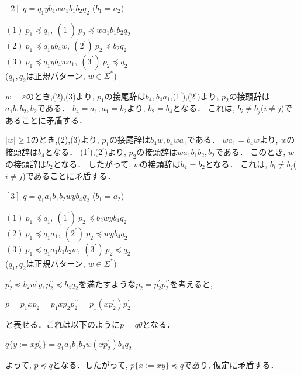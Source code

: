 \noindent $[2]$ $q=q_{1}yb_{4}wa_{1}b_{1}b_{2}q_{2}$ ($b_{1}=a_{2}$)
\medskip

\indent$(1) \ p_{1} \preceq q_{1}, \ (1^{\prime}) \ p_{2} \preceq wa_{1}b_{1}b_{2}q_{2}$ \\
\indent $(2) \ p_{1} \preceq q_{1}yb_{4}w, \ (2^{\prime}) \ p_{2} \preceq b_{2}q_{2}$ \\
\indent $(3) \ p_{1} \preceq q_{1}yb_{4}wa_{1}, \ (3^{\prime}) \ p_{2} \preceq q_{2}$\\
\indent ($q_{1}, q_{2}$は正規パターン, $w \in \Sigma^{\ast}$) 
\medskip

$w= \varepsilon$のとき,(2),(3)より, $p_{1}$の接尾辞は$b_{4}, b_{4}a_{1}$,(1$^{\prime}$),(2$^{\prime}$)より, $p_{2}$の接頭辞は$a_{1}b_{1}b_{2}, b_{2}$である．
$b_{4}=a_{1}, a_{1}=b_{2}$より, $b_{2}=b_{4}$となる．
これは, $b_{i} \ne b_{j}$($i \ne j$)であることに矛盾する．

$|w| \ge 1$のとき,(2),(3)より, $p_{1}$の接尾辞は$b_{4}w, b_{4}wa_{1}$である．
$wa_{1}=b_{4}w$より, $w$の接頭辞は$b_{4}$となる．
(1$^{\prime}$),(2$^{\prime}$)より, $p_{2}$の接頭辞は$wa_{1}b_{1}b_{2}, b_{2}$である．
このとき, $w$の接頭辞は$b_{2}$となる．
したがって, $w$の接頭辞は$b_{4}=b_{2}$となる．
これは, $b_{i} \ne b_{j}$($i \ne j$)であることに矛盾する．
\medskip

\noindent $[3]$ $q=q_{1}a_{1}b_{1}b_{2}wyb_{4}q_{2}$ ($b_{1}=a_{2}$)
\medskip

\indent$(1) \ p_{1} \preceq q_{1}, \ (1^{\prime}) \ p_{2} \preceq b_{2}wyb_{4}q_{2}$ \\
\indent $(2) \ p_{1} \preceq q_{1}a_{1}, \ (2^{\prime}) \ p_{2} \preceq wyb_{4}q_{2}$ \\
\indent $(3) \ p_{1} \preceq q_{1}a_{1}b_{1}b_{2}w, \ (3^{\prime}) \ p_{2} \preceq q_{2}$ \\
\indent ($q_{1}, q_{2}$は正規パターン, $w \in \Sigma^{\ast}$)
\medskip

$p_{2}^{\prime} \preceq b_{2}w^{\prime}y, p_{2}^{\prime\prime} \preceq b_{4}q_{2}$を満たすような$p_{2}=p_{2}^{\prime}p_{2}^{\prime\prime}$を考えると,

$p=p_{1}xp_{2}=p_{1}xp_{2}^{\prime}p_{2}^{\prime\prime}=p_{1}(xp_{2}^{\prime})p_{2}^{\prime\prime}$

\noindent と表せる．これは以下のように$p=q \theta$となる．

$q \{ y := xp_{2}^{\prime} \} = q_{1}a_{1}b_{1}b_{2}w(xp_{2}^{\prime})b_{4}q_{2}$

よって, $p \preceq q$となる．したがって, $p \{ x:=xy \} \preceq q$であり,
仮定に矛盾する．
\medskip

